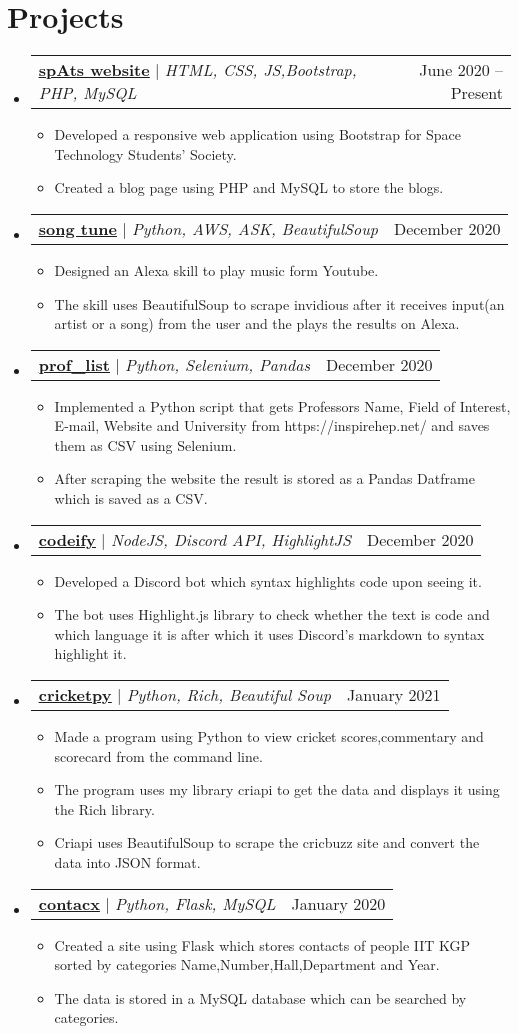 \documentclass[letterpaper,11pt]{article}
\makeatletter
\newcommand{\resumeItem}[1]{
  \item\small{
    {#1 \vspace{-2pt}}
  }
}
\newcommand{\resumeProjectHeading}[2]{
    \item
    \begin{tabular*}{0.97\textwidth}{l@{\extracolsep{\fill}}r}
      \small#1 & #2 \\
    \end{tabular*}\vspace{-7pt}
}
\newcommand{\resumeSubHeadingListStart}{\begin{itemize}[leftmargin=0.15in, label={}]}
\newcommand{\resumeSubHeadingListEnd}{\end{itemize}}
\newcommand{\resumeItemListStart}{\begin{itemize}}
\newcommand{\resumeItemListEnd}{\end{itemize}\vspace{-5pt}}
\makeatother
\begin{document}
\section{Projects}
    \resumeSubHeadingListStart
      \resumeProjectHeading
          {\textbf{\href{http://spats.in/}{\underline{spAts website}}} $|$ \emph{HTML, CSS, JS,Bootstrap, PHP, MySQL}}{June 2020 -- Present}
          \resumeItemListStart
            \resumeItem{Developed a responsive web application using Bootstrap for Space Technology Students' Society.}
            \resumeItem{Created a blog page using PHP and MySQL to store the blogs.}
          \resumeItemListEnd
           \resumeProjectHeading
         {\textbf{\href{https://github.com/sAksham-Ar/song-tune}{\underline{song tune}}} $|$ \emph{Python, AWS, ASK, BeautifulSoup}}{December 2020}
          \resumeItemListStart
            \resumeItem{Designed an Alexa skill to play music form Youtube.}
            \resumeItem{The skill uses BeautifulSoup to scrape invidious after it receives input(an artist or a song) from the user and the plays the results on Alexa.}
          \resumeItemListEnd
           \resumeProjectHeading
         {\textbf{\href{https://github.com/sAksham-Ar/Prof_List}{\underline{prof\_list}}} $|$ \emph{Python, Selenium, Pandas}}{December 2020}
          \resumeItemListStart
            \resumeItem{Implemented a Python script that gets Professors Name, Field of Interest, E-mail, Website and University from https://inspirehep.net/ and saves them as CSV using Selenium. }
            \resumeItem{After scraping the website the result is stored as a Pandas Datframe which is saved as a CSV.}
          \resumeItemListEnd
           \resumeProjectHeading
         {\textbf{\href{https://github.com/sAksham-Ar/codeify}{\underline{codeify}}} $|$ \emph{NodeJS, Discord API, HighlightJS}}{December 2020}
          \resumeItemListStart
            \resumeItem{Developed a Discord bot which syntax highlights code upon seeing it.}
            \resumeItem{The bot uses Highlight.js library to check whether the text is  code and which language it is after which it uses Discord's markdown to syntax highlight it.}
          \resumeItemListEnd
 \resumeProjectHeading
         {\textbf{\href{https://github.com/sAksham-Ar/cricketpy}{\underline{cricketpy}}} $|$ \emph{Python, Rich, Beautiful Soup}}{January 2021}
          \resumeItemListStart
            \resumeItem{Made a program using Python to view cricket scores,commentary and scorecard from the command line.}
            \resumeItem{The program uses my library criapi to get the data and displays it using the Rich library.}
            \resumeItem{Criapi uses BeautifulSoup to scrape the cricbuzz site and convert the data into JSON format.}
          \resumeItemListEnd
 \resumeProjectHeading
         {\textbf{\href{https://github.com/sAksham-Ar/contacx}{\underline{contacx}}} $|$ \emph{Python, Flask, MySQL}}{January 2020}
          \resumeItemListStart
            \resumeItem{Created a site using Flask which stores contacts of people IIT KGP sorted by categories Name,Number,Hall,Department and Year. }
            \resumeItem{The data is stored in a MySQL database which can be searched by categories.}
          \resumeItemListEnd
    \resumeSubHeadingListEnd
\end{document}
